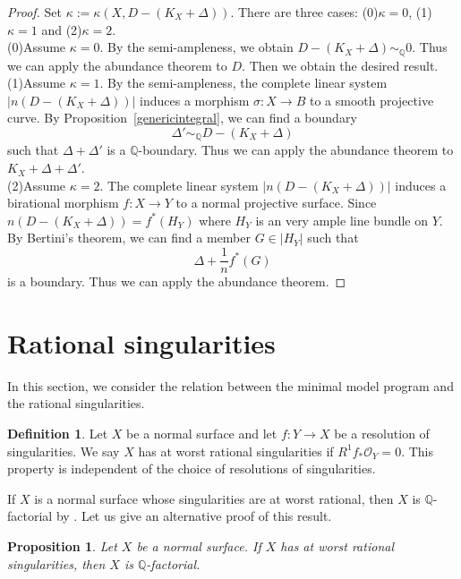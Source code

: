 \documentclass[12pt,twoside]{amsart}
\newtheorem{prop}[thm]{Proposition}
\theoremstyle{definition}
\newtheorem{dfn}[thm]{Definition}
\newcommand{\Q}{$\mathbb{Q}$}
\begin{document}
\begin{proof}
Set $\kappa:=\kappa(X, D-(K_X+\Delta))$. 
There are three cases: (0)$\kappa=0$, (1)$\kappa=1$ and (2)$\kappa=2$. \\
(0)Assume $\kappa=0$. 
By the semi-ampleness, 
we obtain $D-(K_X+\Delta)\sim_{\mathbb{Q}} 0$. 
Thus we can apply the abundance theorem to $D$. 
Then we obtain the desired result. \\
(1)Assume $\kappa=1$. 
By the semi-ampleness, the complete linear system $|n(D-(K_X+\Delta))|$ 
induces a morphism $\sigma:X\to B$ to a smooth projective curve. 
By Proposition~\ref{genericintegral}, 
we can find a boundary 
$$\Delta'\sim_{\mathbb{Q}} D-(K_X+\Delta)$$
such that $\Delta+\Delta'$ is a \Q-boundary. 
Thus we can apply the abundance theorem to $K_X+\Delta+\Delta'$. \\
(2)Assume $\kappa=2$. 
The complete linear system $|n(D-(K_X+\Delta))|$ induces 
a birational morphism $f:X \to Y$ to a normal projective surface. 
Since $n(D-(K_X+\Delta))=f^*(H_Y)$ 
where $H_Y$ is an very ample line bundle on $Y$. 
By Bertini's theorem, we can find a member $G\in|H_Y|$ such that 
$$\Delta+\frac{1}{n}f^*(G)$$
is a boundary. 
Thus we can apply the abundance theorem. 
\end{proof}



\appendix
\def\thesection{B}
\section{Rational singularities}
In this section, 
we consider the relation 
between the minimal model program and the rational singularities. 

\begin{dfn}
Let $X$ be a normal surface and 
let $f:Y \to X$ be a resolution of singularities. 
We say $X$ has at worst rational singularities 
if $R^1f_*\mathcal O_Y=0$. 
This property is independent of the choice of resolutions of singularities. 
\end{dfn}

If $X$ is a normal surface whose singularities are at worst rational, 
then $X$ is \Q-factorial by \cite[Proposition~17.1]{Lipman}. 
Let us give an alternative proof of this result. 

\begin{prop}\label{rational-qfac}
Let $X$ be a normal surface. 
If $X$ has at worst rational singularities, then 
$X$ is \Q-factorial. 
\end{prop}
\end{document}
